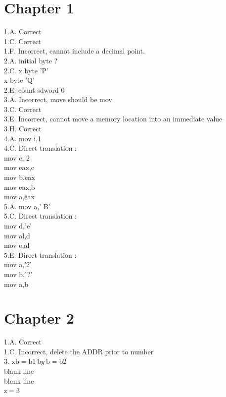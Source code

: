 \documentclass[10pt]{article}
\begin{document}
\section*{Chapter 1}
1.A. Correct\\
1.C. Correct\\
1.F. Incorrect, cannot include a decimal point.\\
2.A. initial byte ?\\
2.C. x byte 'P'\\
x byte 'Q'\\
2.E. count sdword 0\\
3.A. Incorrect, move should be mov\\
3.C. Correct\\
3.E. Incorrect, cannot move a memory location into an immediate value\\
3.H. Correct\\
4.A. mov i,1\\
4.C. Direct translation :\\
mov c, 2\\
mov eax,c\\
mov b,eax\\
mov eax,b\\
mov a,eax\\
5.A. mov a,' B'\\
5.C. Direct translation :\\
mov d,'e'\\
mov al,d\\
mov e,al\\
5.E. Direct translation :\\
mov a,'2'\\
mov b,'?'\\
mov a,b

\section*{Chapter 2}
1.A. Correct\\
1.C. Incorrect, delete the ADDR prior to number\\
3. $\mathrm{xb}=\mathrm{b} 1 \mathrm{~b} y \mathrm{~b}=\mathrm{b} 2$\\
blank line\\
blank line\\
$\mathrm{z}=3$
\end{document}
